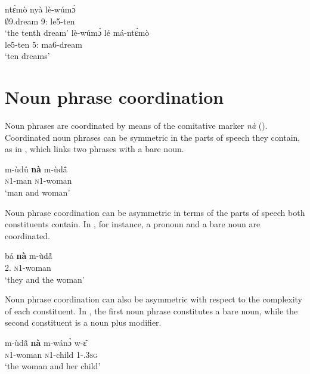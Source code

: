 \ea\label{Ordten}
\ea\label{Ordten1}
 \gll ntɛ́mò nyà lè-wúmɔ̀ \\
 $\emptyset$9.dream 9:{\ATT} le5-ten \\
    \trans `the tenth dream'
\ex\label{Ordten2}    
  \gll lè-wúmɔ̀ lé má-ntɛ́mò \\
  le5-ten 5:{\ATT} ma6-dream \\
     \trans `ten dreams'
\z
\z













\section{Noun phrase coordination}
\label{sec:NPCoord}

Noun phrases are coordinated by means of the comitative marker {\itshape nà} (). Coordinated noun phrases can be symmetric in the parts of speech they contain, as in , which links two phrases with a bare noun.

\ea\label{NPCoord1}
 \gll  m-ùdû {\bfseries nà} m-ùdã̂ \\
            \textsc{n}1-man {\COM} \textsc{n}1-woman \\
    \trans `man and woman'
\z

Noun phrase coordination can be asymmetric in terms of the parts of speech both constituents contain. In , for instance, a pronoun and a bare noun are coordinated.

\ea\label{NPCoord2}
 \gll  bá {\bfseries nà} m-ùdã̂ \\
            2.{\SBJ} {\COM} \textsc{n}1-woman \\
    \trans `they and the woman'
\z



Noun phrase coordination can also be asymmetric with respect to the complexity of each constituent. In , the first noun phrase constitutes a bare noun, while the second constituent is a noun plus modifier.

\ea\label{NPCoord3}
 \gll  m-ùdã̂  {\bfseries nà} m-wánɔ̀ w-ɛ̂ \\
            \textsc{n}1-woman {\COM} \textsc{n}1-child 1-{\POSS}.3\textsc{sg} \\
    \trans `the woman and her child'
\z




